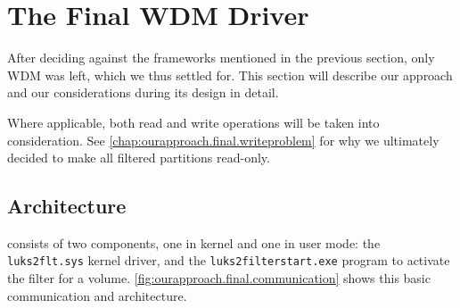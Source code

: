 \section{The Final WDM Driver}
\label{chap:ourapproach.final}
After deciding against the frameworks mentioned in the previous section, only WDM was left, which we thus settled for. This section will describe our approach and our considerations during its design in detail.


Where applicable, both read and write operations will be taken into consideration. See \autoref{chap:ourapproach.final.writeproblem} for why we ultimately decided to make all filtered partitions read-only.

\subsection{Architecture}
\label{chap:ourapproach.final.architecture}
 consists of two components, one in kernel and one in user mode: the \texttt{luks2flt.sys} kernel driver, and the \texttt{luks2filterstart.exe} program to activate the filter for a volume. \autoref{fig:ourapproach.final.communication} shows this basic communication and architecture.

